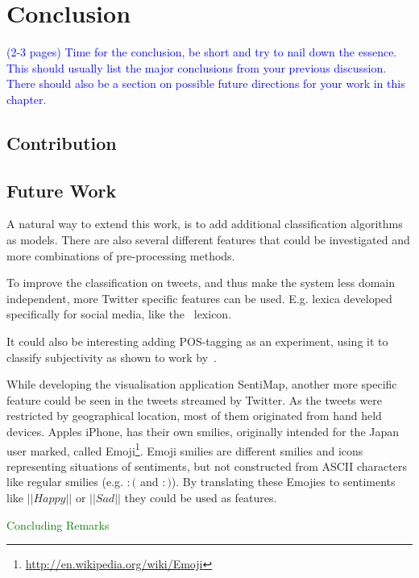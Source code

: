 \chapter{Conclusion}


\textcolor{blue}{(2-3 pages) Time for the conclusion, be short and try to nail down the essence. This should usually 
list the major conclusions from your previous discussion. There should also be a section on possible future directions 
for your work in this chapter.}


\section{Contribution}

\section{Future Work}

A natural way to extend this work, is to add additional classification algorithms as models. There are also several different features that could be investigated and more combinations of pre-processing methods. 

To improve the classification on tweets, and thus make the system less domain independent, more Twitter specific features can be used. E.g. lexica developed specifically for social media, like the~\citet{article:afinn} lexicon. 

It could also be interesting adding POS-tagging as an experiment, using it to classify subjectivity as shown to work by~\citet{article:pak}.

While developing the visualisation application SentiMap, another more specific feature could be seen in the tweets streamed by Twitter. As the tweets were restricted by geographical location, most of them originated from hand held devices. Apples iPhone, has their own smilies, originally intended for the Japan user marked, called Emoji\footnote{\url{http://en.wikipedia.org/wiki/Emoji}}. Emoji smilies are different smilies and icons representing situations of sentiments, but not constructed from ASCII characters like regular smilies (e.g. $:($ and $:)$). By translating these Emojies to sentiments like $||Happy||$ or $||Sad||$ they could be used as features.


\textcolor{green}{Concluding Remarks}
